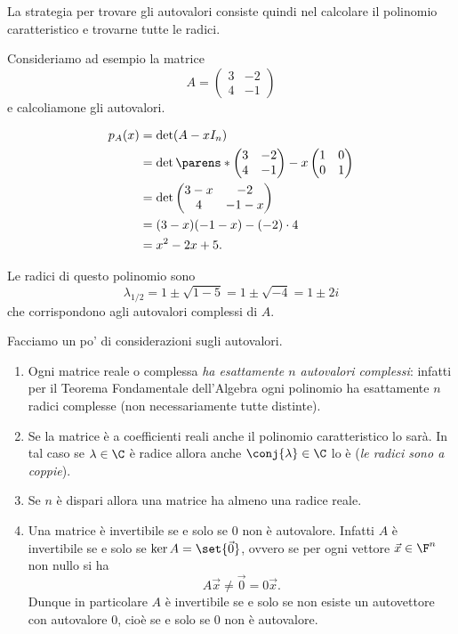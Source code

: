 La strategia per trovare gli autovalori consiste quindi nel calcolare il polinomio caratteristico e trovarne tutte le radici.

\begin{example}
    Consideriamo ad esempio la matrice \[
        A = \begin{pmatrix}
            3 & -2\\
            4 & -1
        \end{pmatrix}
    \] e calcoliamone gli autovalori.

    \begin{align*}
        p_A(x) &= \det (A - xI_n)\\
        &= \det \parens*{
            \begin{pmatrix}
                3 & -2\\
                4 & -1
            \end{pmatrix} - x\begin{pmatrix}
                1 & 0\\
                0 & 1\\
            \end{pmatrix}
        } \\
        &= \det \begin{pmatrix}
            3-x & -2\\
            4   & -1-x
        \end{pmatrix} \\
        &= (3-x)(-1-x) -(-2) \cdot 4\\
        &= x^2 - 2x + 5.
    \end{align*}

    Le radici di questo polinomio sono \[
        \lambda_{1/2} = 1 \pm \sqrt{1 - 5} = 1 \pm \sqrt{-4} = 1 \pm 2i
    \] che corrispondono agli autovalori complessi di $A$.
\end{example}

Facciamo un po' di considerazioni sugli autovalori.
\begin{enumerate}[(1)]
    \item Ogni matrice reale o complessa \emph{ha esattamente $n$ autovalori complessi}: infatti per il Teorema Fondamentale dell'Algebra ogni polinomio ha esattamente $n$ radici complesse (non necessariamente tutte distinte).
    \item Se la matrice è a coefficienti reali anche il polinomio caratteristico lo sarà. In tal caso se $\lambda \in \C$ è radice allora anche $\conj{\lambda} \in \C$ lo è (\emph{le radici sono a coppie}).
    \item Se $n$ è dispari allora una matrice ha almeno una radice reale.
    \item Una matrice è invertibile se e solo se $0$ non è autovalore. Infatti $A$ è  invertibile se e solo se $\ker A = \set{\vec 0}$, ovvero se per ogni vettore $\vec x \in \F^n$ non nullo si ha \[
            A\vec x \neq \vec 0 = 0\vec x.
    \] Dunque in particolare $A$ è invertibile se e solo se non esiste un autovettore con autovalore $0$, cioè se e solo se $0$ non è autovalore. 
\end{enumerate}